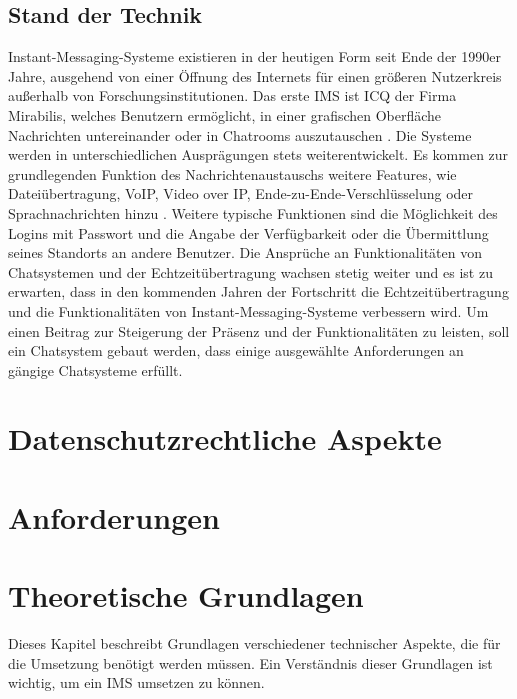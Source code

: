 \documentclass[a4paper,titlepage,halfparskip,12pt]{scrreprt}
\begin{document}
\begin{onehalfspacing}
\pagebreak

\section{Stand der Technik}
\label{sec:StandDerTechnik}

Instant-Messaging-Systeme existieren in der heutigen Form seit Ende der 1990er Jahre, ausgehend von einer Öffnung des Internets für einen größeren Nutzerkreis außerhalb von Forschungsinstitutionen. Das erste \ac{IMS} ist \ac{ICQ} der Firma Mirabilis, welches Benutzern ermöglicht, in einer grafischen Oberfläche Nachrichten untereinander oder in Chatrooms auszutauschen \cite{ICQ}. Die Systeme werden in unterschiedlichen Ausprägungen stets weiterentwickelt. Es kommen zur grundlegenden Funktion des Nachrichtenaustauschs weitere Features, wie Dateiübertragung, \ac{VoIP}, Video over IP, Ende-zu-Ende-Verschlüsselung oder Sprachnachrichten hinzu \cite{gross2007}. 
Weitere typische Funktionen sind die Möglichkeit des Logins mit Passwort und die Angabe der Verfügbarkeit oder die Übermittlung seines Standorts an andere Benutzer. Die Ansprüche an Funktionalitäten von Chatsystemen und der Echtzeitübertragung wachsen stetig weiter und es ist zu erwarten, dass in den kommenden Jahren der Fortschritt die Echtzeitübertragung und die Funktionalitäten von Instant-Messaging-Systeme verbessern wird. Um einen Beitrag zur Steigerung der Präsenz und der Funktionalitäten zu leisten, soll ein Chatsystem gebaut werden, dass einige ausgewählte Anforderungen an gängige Chatsysteme erfüllt.\cite{anastasiaIMS}

\newpage

\chapter{Datenschutzrechtliche Aspekte}
\label{chap:Datenschutz}

\newpage

\chapter{Anforderungen}
\label{Anforderungen}

\newpage

\chapter{Theoretische Grundlagen}
\label{chap:Theorie}

Dieses Kapitel beschreibt Grundlagen verschiedener technischer Aspekte, die für die Umsetzung benötigt werden müssen. Ein Verständnis dieser Grundlagen ist wichtig, um ein \acs{IMS} umsetzen zu können.


\end{onehalfspacing}
\end{document}
